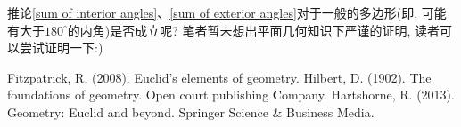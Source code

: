 \documentclass[main]{subfiles}
\begin{document}
	\begin{remark}
		\textup{推论\ref{sum of interior angles}、\ref{sum of exterior angles}对于一般的多边形(即, 可能有大于$180^{\circ}$的内角)是否成立呢? 笔者暂未想出平面几何知识下严谨的证明, 读者可以尝试证明一下:)}
	\end{remark}
	
	{\small
		\begin{thebibliography}{9}
			 Fitzpatrick, R. (2008). Euclid's elements of geometry.
			 Hilbert, D. (1902). The foundations of geometry. Open court publishing Company.
			 Hartshorne, R. (2013). Geometry: Euclid and beyond. Springer Science \& Business Media.
		\end{thebibliography}
	}
\end{document}
